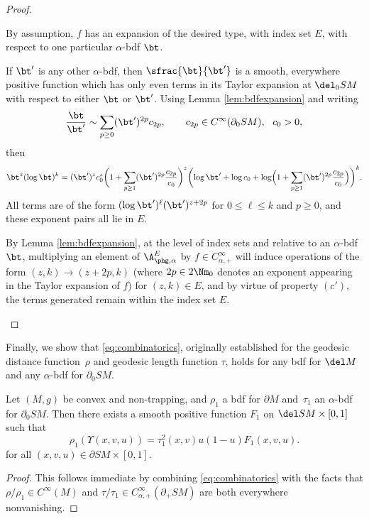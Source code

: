 \skpt
\begin{proof}
\begin{enumeratea}
\item
By assumption, $f$ has an expansion of the desired type, with index set $E$, with respect to one particular $\alpha$-bdf $\bt$.

If $\bt'$ is any other $\alpha$-bdf, then $\sfrac{\bt}{\bt'}$ is a smooth, everywhere positive function which has only even terms in its Taylor expansion at $\del_0 SM$ with respect to either $\bt$ or $\bt'$. Using Lemma \ref{lem:bdfexpansion} and writing\vspace*{-3pt}\enlargethispage{.5\baselineskip}
\begin{equation*}
\frac{\bt}{\bt'} \sim \sum_{p\ge 0} (\bt')^{2p} c_{2p}, \qquad c_{2p}\in C^\infty(\partial_0 SM), \ \ c_0 > 0,
\end{equation*}
then\vspace*{-5pt}
\begin{equation*}
\bt^z (\log \bt)^k = (\bt')^z c^z_0 \biggl(1 + \sum_{p\ge 1} (\bt')^{2p} \frac{c_{2p}}{c_0} \biggr)^z \biggl(\log \bt' + \log c_0 + \log \Bigl(1 + \sum_{p\ge 1} (\bt')^{2p} \frac{c_{2p}}{c_0} \Bigr)\biggr)^k.
\end{equation*}
All terms are of the form $(\log \bt')^{\ell} (\bt')^{z+2p}$ for $0\le \ell \le k$ and $p\ge 0$, and these exponent pairs all lie in $E$.

\item
By Lemma \ref{lem:bdfexpansion}, at the level of index sets and relative to an $\alpha$-bdf $\bt$, multiplying an element of $\A_{\phg,\alpha}^E$ by $f\in C_{\alpha,+}^\infty$ will induce operations of the form $(z,k)\to (z+2p,k)$ (where $2p\in 2\Nm_0$ denotes an exponent appearing in the Taylor expansion of $f$) for $(z,k)\in E$, and by virtue of property $(c')$, the terms generated remain within the index set $E$.\qedhere
\end{enumeratea}
\end{proof}

Finally, we show that \eqref{eq:combinatorics}, originally established for the geodesic distance function~$\rho$
and geodesic length function $\tau$, holds for any bdf for $\del M$ and any $\alpha$-bdf for $\partial_0 SM$.

\begin{Proposition}\label{prop:combinatorics2}
Let $(M,g)$ be convex and non-trapping, and $\rho_1$ a bdf for $\partial M$ and~$\tau_1$ an $\alpha$-bdf for $\partial_0 SM$.
Then there exists a smooth positive function $F_1$ on $\del SM\times [0,1]$ such that
\begin{equation*}
\rho_1 (\Upsilon(x,v,u)) = \tau_1^2 (x,v) u(1-u) F_1(x,v,u).
\end{equation*}
for all $(x,v,u)\in \partial SM\times [0,1]$.
\end{Proposition}
\begin{proof}
This follows immediate by combining \eqref{eq:combinatorics} with the facts that $\rho/\rho_1 \in C^\infty(M)$
and $\tau/\tau_1\in C_{\alpha,+}^\infty(\partial_+ SM)$ are both everywhere nonvanishing.
\end{proof}

